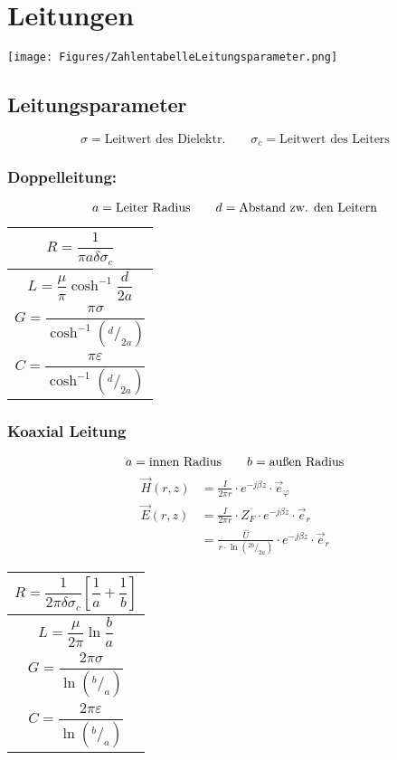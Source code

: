 \section{Leitungen}
\texttt{[image: Figures/ZahlentabelleLeitungsparameter.png]}

\subsection{Leitungsparameter}

{\small\[
        \sigma = \text{Leitwert des Dielektr.} \qquad \sigma_c = \text{Leitwert des Leiters}
    \]}

\subsubsection{Doppelleitung:}
{\small\[
        a = \text{Leiter Radius} \qquad d = \text{Abstand zw. den Leitern} \\
    \]}

{\renewcommand*{\arraystretch}{0.2}
    \begin{tabularx}{0.5\columnwidth}{|X|}
        \hline
        \[R  = \frac{1}{\pi a\delta\sigma_c}\]              \\
        \hline
        \[L = \frac{\mu}{\pi} \cosh^{-1}\frac{d}{2a}\]      \\
        \hline
        \[G = \frac{\pi\sigma}{\cosh^{-1}(^d/_{2a})}\]      \\
        \hline
        \[C = \frac{\pi\varepsilon}{\cosh^{-1}(^d/_{2a})}\] \\
        \hline
    \end{tabularx}}

\subsubsection{Koaxial Leitung}
{\small\[
        a = \text{innen Radius} \qquad b = \text{außen Radius} \\
    \]}
\begin{align*}
    \vec{H}(r, z) & = \frac{I}{2\pi r}\cdot e^{-j\beta z}\cdot\vec{e}_\varphi                    \\
    \vec{E}(r, z) & = \frac{I}{2\pi r}\cdot Z_F\cdot e^{-j\beta z} \cdot\vec{e}_r                \\
                  & = \frac{\hat{U}}{r \cdot\ln{(^{2b}/_{2a})}}\cdot e^{-j\beta z}\cdot\vec{e}_r
\end{align*}

{\renewcommand*{\arraystretch}{0.2}
    \begin{tabularx}{0.5\columnwidth}{|X|}
        \hline
        \[R=\frac{1}{2\pi\delta\sigma_c}\left[\frac{1}{a}+\frac{1}{b}\right]\] \\
        \hline
        \[L=\frac{\mu}{2\pi}\ln\frac{b}{a}\]                                   \\
        \hline
        \[G=\frac{2\pi\sigma}{\ln(^b/_a)}\]                                    \\
        \hline
        \[C=\frac{2\pi\varepsilon}{\ln(^b/_a)}\]                               \\
        \hline
    \end{tabularx}}

